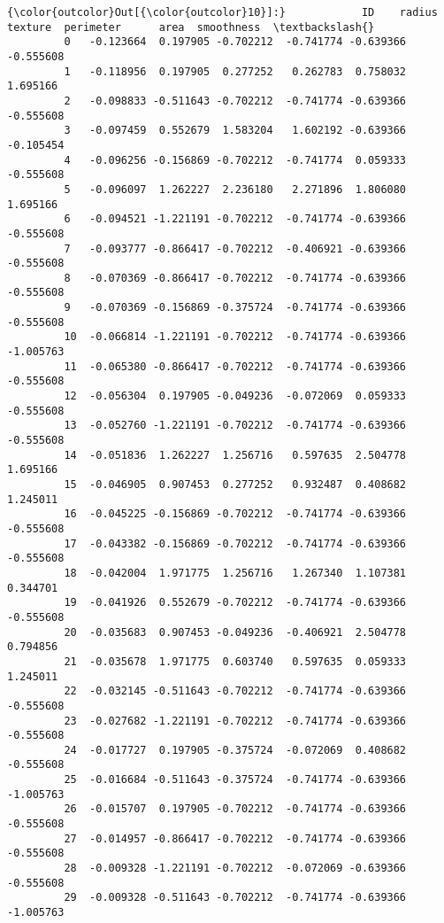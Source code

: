 \documentclass[11pt]{article}
\begin{document}
\begin{Verbatim}[commandchars=\\\{\}]
{\color{outcolor}Out[{\color{outcolor}10}]:}            ID    radius   texture  perimeter      area  smoothness  \textbackslash{}
         0   -0.123664  0.197905 -0.702212  -0.741774 -0.639366   -0.555608   
         1   -0.118956  0.197905  0.277252   0.262783  0.758032    1.695166   
         2   -0.098833 -0.511643 -0.702212  -0.741774 -0.639366   -0.555608   
         3   -0.097459  0.552679  1.583204   1.602192 -0.639366   -0.105454   
         4   -0.096256 -0.156869 -0.702212  -0.741774  0.059333   -0.555608   
         5   -0.096097  1.262227  2.236180   2.271896  1.806080    1.695166   
         6   -0.094521 -1.221191 -0.702212  -0.741774 -0.639366   -0.555608   
         7   -0.093777 -0.866417 -0.702212  -0.406921 -0.639366   -0.555608   
         8   -0.070369 -0.866417 -0.702212  -0.741774 -0.639366   -0.555608   
         9   -0.070369 -0.156869 -0.375724  -0.741774 -0.639366   -0.555608   
         10  -0.066814 -1.221191 -0.702212  -0.741774 -0.639366   -1.005763   
         11  -0.065380 -0.866417 -0.702212  -0.741774 -0.639366   -0.555608   
         12  -0.056304  0.197905 -0.049236  -0.072069  0.059333   -0.555608   
         13  -0.052760 -1.221191 -0.702212  -0.741774 -0.639366   -0.555608   
         14  -0.051836  1.262227  1.256716   0.597635  2.504778    1.695166   
         15  -0.046905  0.907453  0.277252   0.932487  0.408682    1.245011   
         16  -0.045225 -0.156869 -0.702212  -0.741774 -0.639366   -0.555608   
         17  -0.043382 -0.156869 -0.702212  -0.741774 -0.639366   -0.555608   
         18  -0.042004  1.971775  1.256716   1.267340  1.107381    0.344701   
         19  -0.041926  0.552679 -0.702212  -0.741774 -0.639366   -0.555608   
         20  -0.035683  0.907453 -0.049236  -0.406921  2.504778    0.794856   
         21  -0.035678  1.971775  0.603740   0.597635  0.059333    1.245011   
         22  -0.032145 -0.511643 -0.702212  -0.741774 -0.639366   -0.555608   
         23  -0.027682 -1.221191 -0.702212  -0.741774 -0.639366   -0.555608   
         24  -0.017727  0.197905 -0.375724  -0.072069  0.408682   -0.555608   
         25  -0.016684 -0.511643 -0.375724  -0.741774 -0.639366   -1.005763   
         26  -0.015707  0.197905 -0.702212  -0.741774 -0.639366   -0.555608   
         27  -0.014957 -0.866417 -0.702212  -0.741774 -0.639366   -0.555608   
         28  -0.009328 -1.221191 -0.702212  -0.072069 -0.639366   -0.555608   
         29  -0.009328 -0.511643 -0.702212  -0.741774 -0.639366   -1.005763   

\end{Verbatim}
\end{document}
